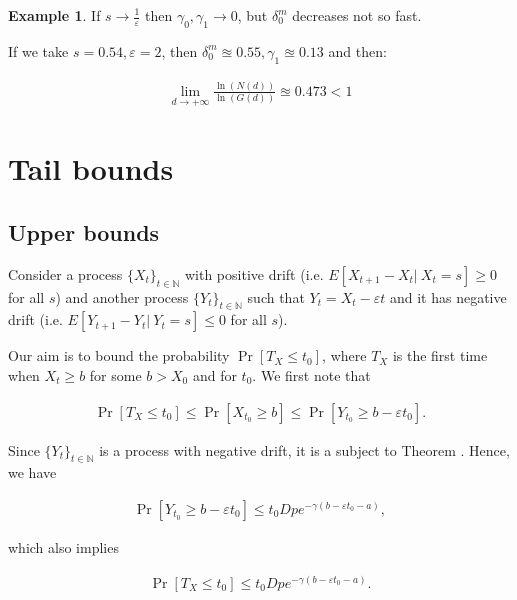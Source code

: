 \documentclass[12pt, a4paper]{article}
\theoremstyle{remark}
\theoremstyle{definition}
\newtheorem*{exmp}{Example}
\newcommand{\limd}{\lim\limits_{d \to +\infty}}
\begin{document}
\begin{exmp}

    If \(s \to \frac{1}{\varepsilon}\) then \(\gamma_0, \gamma_1 \to 0\), but \(\delta_0^m\) decreases not so fast.

    If we take \(s = 0.54, \varepsilon = 2\), then \(
        \delta_0^m \approxeq 0.55, \gamma_1 \approxeq 0.13\) and then:

    \begin{align*}
        \limd \frac{\ln(N(d))}{\ln(G(d))} \approxeq 0.473 < 1
    \end{align*}

\end{exmp}





\section{Tail bounds}
\subsection{Upper bounds}
Consider a process $\{X_t\}_{t \in \mathbb{N}}$ with positive drift (i.e. $E[X_{t + 1} - X_t |\ X_t = s] \geq 0$ for all $s$) and another process $\{Y_t\}_{t \in \mathbb{N}}$ such that $Y_t = X_t - \varepsilon t$ and it has negative drift (i.e. $E[Y_{t + 1} - Y_t |\ Y_t = s] \leq 0$ for all $s$).

Our aim is to bound the probability $\Pr[T_X \leq t_0]$, where $T_X$ is the first time when $X_t \geq b$ for some $b > X_0$ and for $t_0$. We first note that

\begin{align*}
    \Pr[T_X \leq t_0] \leq \Pr[X_{t_0} \geq b] \leq \Pr[Y_{t_0} \geq b - \varepsilon t_0].
\end{align*}

Since $\{Y_t\}_{t \in \mathbb{N}}$ is a process with negative drift, it is a subject to Theorem \cite{}. Hence, we have

\begin{align*}
    \Pr[Y_{t_0} \geq b - \varepsilon t_0] \leq t_0 D p e^{-\gamma(b - \varepsilon t_0 - a)},
\end{align*}

which also implies

\begin{align*}
    \Pr[T_X \leq t_0] \leq t_0 D p e^{-\gamma(b - \varepsilon t_0 - a)}.
\end{align*}
\end{document}
